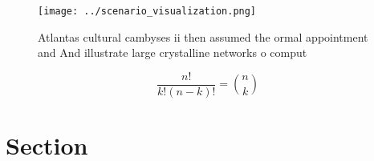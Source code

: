 \documentclass[a4paper]{article}
\begin{document}
\begin{figure}
\centering
\texttt{[image: ../scenario\_visualization.png]}
\caption{Atlantas cultural cambyses ii then assumed the ormal appointment and And illustrate large crystalline networks o comput
}
\end{figure}
 
\[ \frac{n!}{k!(n-k)!} = \binom{n}{k} \]

\section{Section}
\end{document}

